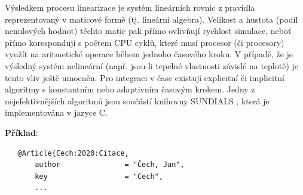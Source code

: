 Výsledkem procesu linearizace je systém lineárních rovnic z pravidla
reprezentovaný v maticové formě (tj. lineární algebra). Velikost a hustota 
(podíl nenulových hodnot) těchto matic pak přímo ovlivňují rychlost simulace, 
neboť přímo korespondují s počtem CPU cyklů, které musí procesor (či procesory)
využít na aritmetické operace během jednoho časového kroku. V případě, že je
výsledný systém nelineární (např. jsou-li tepelné vlastnosti závislé na
teplotě) je tento vliv ještě umocněn. Pro integraci v čase existují explicitní
či implicitní algoritmy s konstantním nebo adaptivním časovým krokem. Jedny z
nejefektivnějších algoritmů jsou součástí knihovny SUNDIALS
, která je implementována v jazyce C.
\label{kapitoly}


\textbf{Příklad}:
\begin{verbatim}
   @Article{Cech:2020:Citace,
	   author               = "Čech, Jan",
	   key                  = "Cech",
	   ... 
\end{verbatim}


